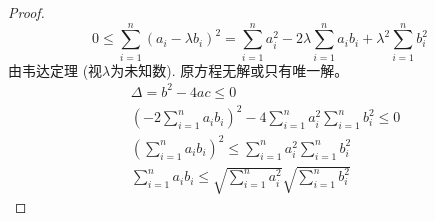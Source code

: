 \begin{proof}
	\begin{equation*}
		 0 \le \sum_{i=1}^n (a_i - \lambda b_i)^2  = \sum_{i=1}^n a_i^2 - 2 \lambda \sum_{i=1}^n a_i b_i  + \lambda^2 \sum_{i=1}^n b_i^2
	\end{equation*}
	由韦达定理 (视$ \lambda $为未知数). 原方程无解或只有唯一解。
	\begin{align*}
		&\Delta = b^2-4ac \le 0\\
		&(-2\sum_{i=1}^n a_i b_i)^2 - 4\sum_{i=1}^n a_i^2 \sum_{i=1}^n b_i^2 \le 0 \\
		&(\sum_{i=1}^n a_i b_i)^2 \le \sum_{i=1}^n a_i^2 \sum_{i=1}^n b_i^2 \\
		&\sum_{i=1}^n a_i b_i \le \sqrt{\sum_{i=1}^n a_i^2} \sqrt{\sum_{i=1}^n b_i^2} 
	\end{align*}
\end{proof}


